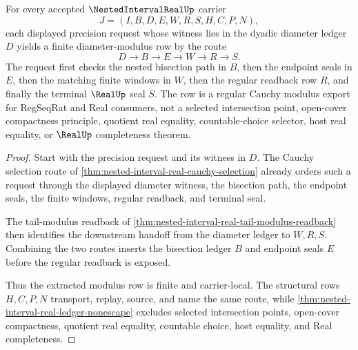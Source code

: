 \begin{theorem}
\label{thm:nested-interval-real-diameter-modulus}
For every accepted $\NestedIntervalRealUp$ carrier
$$
J=(I,B,D,E,W,R,S,H,C,P,N),
$$
each displayed precision request whose witness lies in the dyadic diameter ledger $D$ yields a finite diameter-modulus row by the route
$$
D \longrightarrow B \longrightarrow E \longrightarrow W \longrightarrow R \longrightarrow S .
$$
The request first checks the nested bisection path in $B$, then the endpoint seals in $E$, then the matching finite windows in $W$, then the regular readback row $R$, and finally the terminal $\RealUp$ seal $S$. The row is a regular Cauchy modulus export for RegSeqRat and Real consumers, not a selected intersection point, open-cover compactness principle, quotient real equality, countable-choice selector, host real equality, or $\RealUp$ completeness theorem.
\end{theorem}
\begin{proof}
Start with the precision request and its witness in $D$. The Cauchy selection route of \autoref{thm:nested-interval-real-cauchy-selection} already orders such a request through the displayed diameter witness, the bisection path, the endpoint seals, the finite windows, regular readback, and terminal seal.

The tail-modulus readback of \autoref{thm:nested-interval-real-tail-modulus-readback} then identifies the downstream handoff from the diameter ledger to $W,R,S$. Combining the two routes inserts the bisection ledger $B$ and endpoint seals $E$ before the regular readback is exposed.

Thus the extracted modulus row is finite and carrier-local. The structural rows $H,C,P,N$ transport, replay, source, and name the same route, while \autoref{thm:nested-interval-real-ledger-nonescape} excludes selected intersection points, open-cover compactness, quotient real equality, countable choice, host equality, and Real completeness.
\end{proof}

